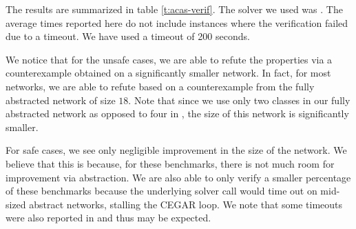 The results are summarized in table \ref{t:acas-verif}. The solver we used was
\abcrown. The average times reported here do not include instances where the
verification failed due to a timeout. We have used a timeout of 200 seconds.

We notice that for the unsafe cases, we are able to refute the
properties via a counterexample obtained on a significantly smaller network. In
fact, for most networks, we are able to refute based on a counterexample from
the fully abstracted network of size $18$. Note that since we use only two classes in our
fully abstracted network as opposed to four in \cite{cegar-nn}, the size of this
network is significantly smaller. 

For safe cases, we see only negligible improvement in the size of the network.
We believe that this is because, for these benchmarks, there is not much room for
improvement via abstraction. We are also able to only verify a smaller
percentage of these benchmarks because the underlying solver call would time
out on mid-sized abstract networks, stalling
the CEGAR loop. We note that some timeouts were also reported in
\cite{cegar-nn} and thus may be expected.

